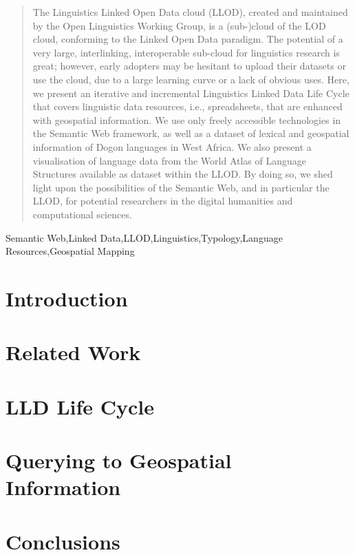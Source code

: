 \documentclass{iosart2c}
\begin{document}
\begin{frontmatter}
\begin{abstract}
The Linguistics Linked Open Data cloud (LLOD), created and maintained by the Open Linguistics Working Group, is a (sub-)cloud of the LOD cloud, conforming to the Linked Open Data paradigm. The potential of a very large, interlinking, interoperable sub-cloud for linguistics research is great; however, early adopters may be hesitant to upload their datasets or use the cloud, due to a large learning curve or a lack of obvious uses. Here, we present an iterative and incremental Linguistics Linked Data Life Cycle that covers linguistic data resources, i.e., spreadsheets, that are enhanced with geospatial information. We use only freely accessible technologies in the Semantic Web framework, as well as a dataset of lexical and geospatial information of Dogon languages in West Africa. We also present a visualisation of language data from the World Atlas of Language Structures available as dataset within the LLOD. By doing so, we shed light upon the possibilities of the Semantic Web, and in particular the LLOD, for potential researchers in the digital humanities and computational sciences. %
\end{abstract}

\begin{keyword}
Semantic Web\sep Linked Data\sep LLOD\sep Linguistics\sep Typology\sep Language Resources\sep Geospatial Mapping
\end{keyword}

\end{frontmatter}


\section{Introduction}\label{sec:intro}


\section{Related Work}


\section{LLD Life Cycle}


\section{Querying to Geospatial Information}\label{sec:query}


\section{Conclusions}




\end{document}
